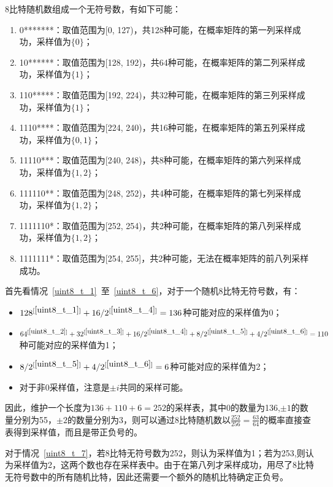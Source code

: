 \documentclass{article}
\begin{document}
    
    8比特随机数组成一个无符号数，有如下可能：
    \begin{enumerate}
        \item 0*******：取值范围为[0, 127)，共128种可能，在概率矩阵的第一列采样成功，采样值为$\{0\}$；\label{uint8_t_1}
        \item 10******：取值范围为[128, 192)，共64种可能，在概率矩阵的第二列采样成功，采样值为$\{1\}$；\label{uint8_t_2}
        \item 110*****：取值范围为[192, 224)，共32种可能，在概率矩阵的第三列采样成功，采样值为$\{1\}$；\label{uint8_t_3}
        \item 1110****：取值范围为[224, 240)，共16种可能，在概率矩阵的第五列采样成功，采样值为$\{0, 1\}$；\label{uint8_t_4}
        \item 11110***：取值范围为[240, 248)，共8种可能，在概率矩阵的第六列采样成功，采样值为$\{1, 2\}$；\label{uint8_t_5}
        \item 111110**：取值范围为[248, 252)，共4种可能，在概率矩阵的第七列采样成功，采样值为$\{1, 2\}$；\label{uint8_t_6}
        \item 1111110*：取值范围为[252, 254)，共2种可能，在概率矩阵的第八列采样成功，采样值为$\{1, 2\}$；\label{uint8_t_7}
        \item 1111111*：取值范围为[254, 255]，共2种可能，无法在概率矩阵的前八列采样成功。\label{uint8_t_8}
    \end{enumerate}
    首先看情况~\ref{uint8_t_1}~至~\ref{uint8_t_6}，对于一个随机8比特无符号数，有：
    \begin{itemize}
        \item $128^{[\ref{uint8_t_1}]} + 16/2^{[\ref{uint8_t_4}]} = 136$种可能对应的采样值为0；
        \item $64^{[\ref{uint8_t_2}]} + 32^{[\ref{uint8_t_3}]} + 16/2^{[\ref{uint8_t_4}]} + 8/2^{[\ref{uint8_t_5}]} + 4/2^{[\ref{uint8_t_6}]} = 110$种可能对应的采样值为1；
        \item $8/2^{[\ref{uint8_t_5}]} + 4/2^{[\ref{uint8_t_6}]} = 6$种可能对应的采样值为2；
        \item 对于非0采样值，注意是$\pm i$共同的采样可能。
    \end{itemize}
    因此，维护一个长度为$136 + 110 + 6 = 252$的采样表，其中0的数量为136,$\pm1$的数量分别为55，$\pm2$的数量分别为3，则可以通过8比特随机数以$\frac{252}{256} = \frac{63}{64}$的概率直接查表得到采样值，而且是带正负号的。
    
    对于情况~\ref{uint8_t_7}，若8比特无符号数为252，则认为采样值为1；若为253,则认为采样值为2，这两个数也存在采样表中。由于在第八列才采样成功，用尽了8比特无符号数中的所有随机比特，因此还需要一个额外的随机比特确定正负号。
    
\end{document}
